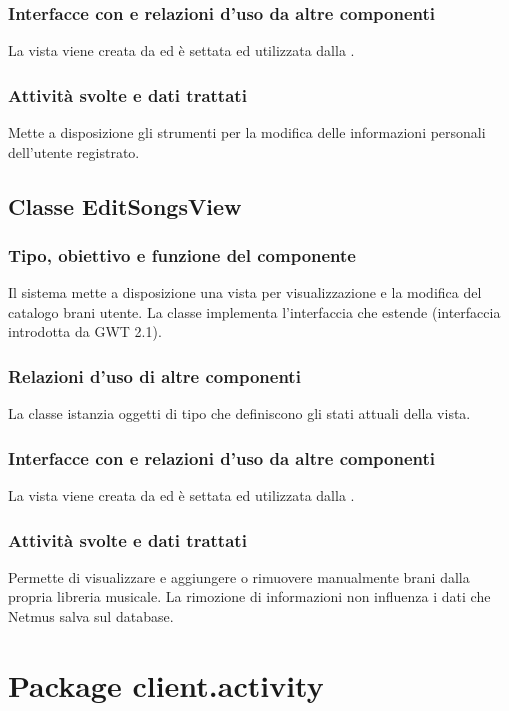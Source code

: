 \subsubsection*{Interfacce con e relazioni d'uso da altre componenti}
La vista viene creata da  ed \`e settata ed utilizzata dalla
.
\subsubsection*{Attivit\`a svolte e dati trattati}
Mette a disposizione gli strumenti per la modifica delle informazioni personali
dell'utente registrato.

\subsection{Classe EditSongsView}
\subsubsection*{Tipo, obiettivo e funzione del componente}
Il sistema mette a disposizione una vista per visualizzazione e la modifica del
catalogo brani utente. La classe  implementa l'interfaccia
 che estende  (interfaccia introdotta da GWT
2.1).
\subsubsection*{Relazioni d'uso di altre componenti}
La classe istanzia oggetti di tipo  che definiscono gli stati
attuali della vista.
\subsubsection*{Interfacce con e relazioni d'uso da altre componenti}
La vista viene creata da  ed \`e settata ed utilizzata dalla
.
\subsubsection*{Attivit\`a svolte e dati trattati}
Permette di visualizzare e aggiungere o rimuovere manualmente brani dalla
propria libreria musicale. La rimozione di informazioni non influenza i dati che
Netmus salva sul database.

\newpage
\section{Package client.activity} %
